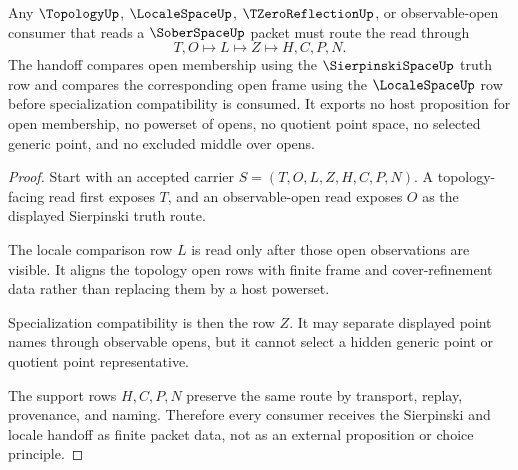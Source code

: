 \begin{theorem}
\label{thm:sober-space-sierpinski-locale-handoff}
Any $\TopologyUp$, $\LocaleSpaceUp$, $\TZeroReflectionUp$, or observable-open consumer that reads a $\SoberSpaceUp$ packet must route the read through
$$
T,O \longmapsto L \longmapsto Z \longmapsto H,C,P,N .
$$
The handoff compares open membership using the $\SierpinskiSpaceUp$ truth row and compares the corresponding open frame using the $\LocaleSpaceUp$ row before specialization compatibility is consumed. It exports no host proposition for open membership, no powerset of opens, no quotient point space, no selected generic point, and no excluded middle over opens.
\end{theorem}
\begin{proof}
Start with an accepted carrier $S=(T,O,L,Z,H,C,P,N)$. A topology-facing read first exposes $T$, and an observable-open read exposes $O$ as the displayed Sierpinski truth route.

The locale comparison row $L$ is read only after those open observations are visible. It aligns the topology open rows with finite frame and cover-refinement data rather than replacing them by a host powerset.

Specialization compatibility is then the row $Z$. It may separate displayed point names through observable opens, but it cannot select a hidden generic point or quotient point representative.

The support rows $H,C,P,N$ preserve the same route by transport, replay, provenance, and naming. Therefore every consumer receives the Sierpinski and locale handoff as finite packet data, not as an external proposition or choice principle.
\end{proof}

